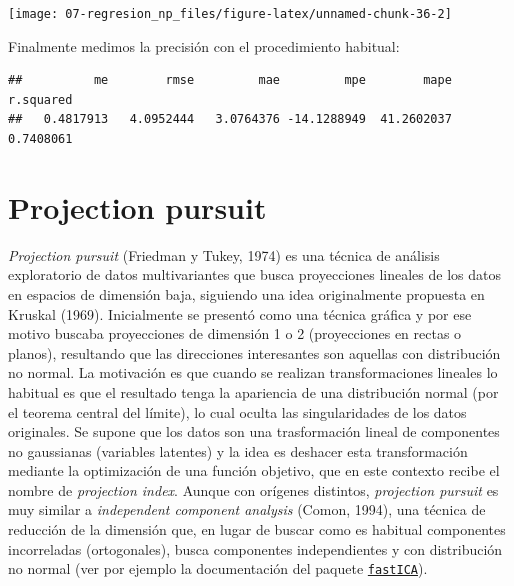 \documentclass[
]{book}
\newenvironment{Shaded}{\begin{snugshade}}{\end{snugshade}}
\newcommand{\DataTypeTok}[1]{\textcolor[rgb]{0.13,0.29,0.53}{#1}}
\newcommand{\KeywordTok}[1]{\textcolor[rgb]{0.13,0.29,0.53}{\textbf{#1}}}
\newcommand{\NormalTok}[1]{#1}
\newcommand{\OperatorTok}[1]{\textcolor[rgb]{0.81,0.36,0.00}{\textbf{#1}}}
\newcommand{\StringTok}[1]{\textcolor[rgb]{0.31,0.60,0.02}{#1}}
\theoremstyle{break}
\theoremstyle{definition}
\theoremstyle{definition}
\theoremstyle{definition}
\theoremstyle{remark}
\begin{document}
\begin{center}\texttt{[image: 07-regresion\_np\_files/figure-latex/unnamed-chunk-36-2]} \end{center}

Finalmente medimos la precisión con el procedimiento habitual:

\begin{Shaded}
\end{Shaded}

\begin{verbatim}
##          me        rmse         mae         mpe        mape   r.squared 
##   0.4817913   4.0952444   3.0764376 -14.1288949  41.2602037   0.7408061
\end{verbatim}

\hypertarget{projection-pursuit}{%
\section{Projection pursuit}\label{projection-pursuit}}

\emph{Projection pursuit} (Friedman y Tukey, 1974) es una técnica de análisis exploratorio de datos multivariantes que busca proyecciones lineales de los datos en espacios de dimensión baja, siguiendo una idea originalmente propuesta en Kruskal (1969).
Inicialmente se presentó como una técnica gráfica y por ese motivo buscaba proyecciones de dimensión 1 o 2 (proyecciones en rectas o planos), resultando que las direcciones interesantes son aquellas con distribución no normal.
La motivación es que cuando se realizan transformaciones lineales lo habitual es que el resultado tenga la apariencia de una distribución normal (por el teorema central del límite), lo cual oculta las singularidades de los datos originales.
Se supone que los datos son una trasformación lineal de componentes no gaussianas (variables latentes) y la idea es deshacer esta transformación mediante la optimización de una función objetivo, que en este contexto recibe el nombre de \emph{projection index}.
Aunque con orígenes distintos, \emph{projection pursuit} es muy similar a \emph{independent component analysis} (Comon, 1994), una técnica de reducción de la dimensión que, en lugar de buscar como es habitual componentes incorreladas (ortogonales), busca componentes independientes y con distribución no normal (ver por ejemplo la documentación del paquete \href{https://CRAN.R-project.org/package=fastICA}{\texttt{fastICA}}).
\end{document}
